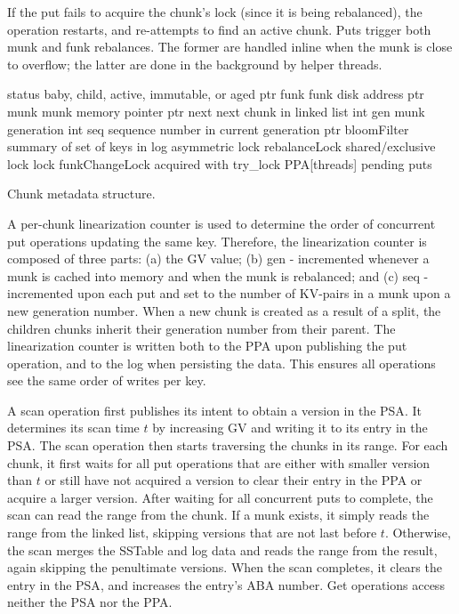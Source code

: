 \documentclass[letterpaper,twocolumn,10pt]{article}
\newcommand{\code}[1]{\textsf{\fontsize{9}{11}\selectfont #1}}
\begin{document}
If the put fails to acquire the chunk's lock (since it is being rebalanced), the operation restarts, and re-attempts to find an active chunk.
Puts trigger both munk and funk rebalances. The former are handled inline when the munk is close to overflow; the latter are done in the background 
by helper threads.

\begin{algorithm}[tb]
\begin{algorithmic}
\State \code{status} \Comment  baby, child, active, immutable, or aged
\State ptr \code{funk} \Comment funk disk address
\State ptr \code{munk} \Comment munk memory pointer
\State ptr \code{next} \Comment next chunk in linked list
\State int \code{gen} \Comment munk generation
\State int \code{seq} \Comment sequence number in current generation 
\State ptr \code{bloomFilter} \Comment summary of set of keys in \code{log}
\State asymmetric lock \code{rebalanceLock} \Comment shared/exclusive lock 
\State lock \code{funkChangeLock} \Comment acquired with try\_lock 
\State \code{PPA[threads]} \Comment pending puts
\end{algorithmic}
\caption{Chunk metadata structure.}
\label{alg:chunk}
\end{algorithm}



A per-chunk linearization counter is used to determine the order of concurrent put operations updating the same key.  
Therefore, the linearization counter is composed of three parts: (a) the GV value; (b) \code{gen} - incremented whenever a munk is cached into memory and when the munk is rebalanced; and (c) \code{seq} - incremented upon each put and set to the number of KV-pairs in a munk upon a new generation number. When a new chunk is created as a result of a split, the children chunks inherit their generation number from their parent. The linearization counter is written both to the \code{PPA} upon publishing the put operation, and to the \code{log} when persisting the data. This ensures all operations see the same order of writes per key.

A scan operation first publishes its intent to obtain a version in the \code{PSA}. It determines its scan time $t$ by increasing GV and writing it to its entry in the \code{PSA}. The scan operation then starts traversing the chunks in its range. For each chunk, it first waits for all put operations that are either with smaller version than $t$ or still have not acquired a version to clear their entry in the \code{PPA} or acquire a larger version. After waiting for all concurrent puts to complete, the scan  can read the range from the chunk. If a munk exists, it simply reads the range from the linked list, skipping versions that are not last before $t$. Otherwise, the scan merges the \code{SSTable} and \code{log} data and reads the range from the result, again skipping the penultimate versions. When the scan completes, it clears the entry in the \code{PSA}, and increases the entry's ABA number. Get operations access neither the \code{PSA} nor the \code{PPA}.%
\end{document}
